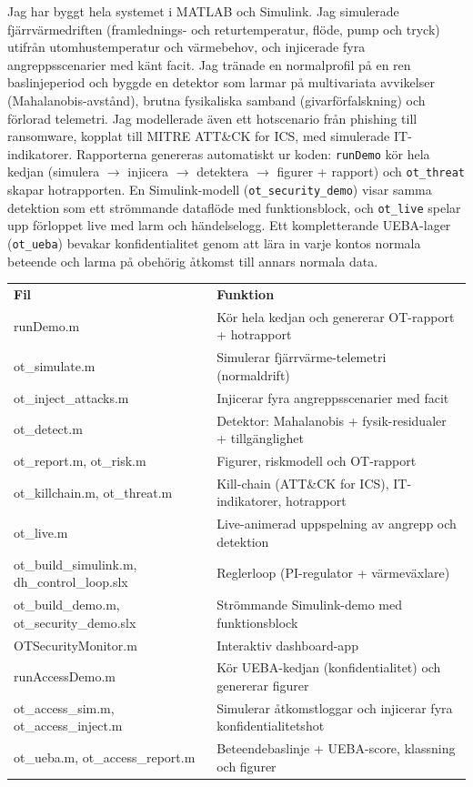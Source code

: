 \documentclass[11pt,a4paper]{article}
\newcommand{\secbar}[1]{\vspace{4pt}{\color{th}\large\bfseries #1}\par\vspace{-4pt}{\color{th}\rule{\linewidth}{1.2pt}}\par}
\begin{document}
\secbar{13. Genomförande och filer}
Jag har byggt hela systemet i MATLAB och Simulink. Jag simulerade fjärrvärmedriften
(framlednings- och returtemperatur, flöde, pump och tryck) utifrån utomhustemperatur och
värmebehov, och injicerade fyra angreppsscenarier med känt facit. Jag tränade en normalprofil på en
ren baslinjeperiod och byggde en detektor som larmar på multivariata avvikelser (Mahalanobis-avstånd),
brutna fysikaliska samband (givarförfalskning) och förlorad telemetri. Jag modellerade även ett
hotscenario från phishing till ransomware, kopplat till MITRE ATT\&CK for ICS, med simulerade
IT-indikatorer. Rapporterna genereras automatiskt ur koden: \texttt{runDemo} kör hela kedjan
(simulera $\rightarrow$ injicera $\rightarrow$ detektera $\rightarrow$ figurer + rapport) och
\texttt{ot\_threat} skapar hotrapporten. En Simulink-modell (\texttt{ot\_security\_demo}) visar samma
detektion som ett strömmande dataflöde med funktionsblock, och \texttt{ot\_live} spelar upp förloppet
live med larm och händelselogg. Ett kompletterande UEBA-lager (\texttt{ot\_ueba}) bevakar konfidentialitet genom att lära in varje kontos normala beteende och larma på obehörig åtkomst till annars normala data.

\begin{tabularx}{\linewidth}{@{}l X@{}}
\rowcolor{th}\color{white}\textbf{Fil} & \color{white}\textbf{Funktion}\\
runDemo.m & Kör hela kedjan och genererar OT-rapport + hotrapport\\
ot\_simulate.m & Simulerar fjärrvärme-telemetri (normaldrift)\\
ot\_inject\_attacks.m & Injicerar fyra angreppsscenarier med facit\\
ot\_detect.m & Detektor: Mahalanobis + fysik-residualer + tillgänglighet\\
ot\_report.m, ot\_risk.m & Figurer, riskmodell och OT-rapport\\
ot\_killchain.m, ot\_threat.m & Kill-chain (ATT\&CK for ICS), IT-indikatorer, hotrapport\\
ot\_live.m & Live-animerad uppspelning av angrepp och detektion\\
ot\_build\_simulink.m, dh\_control\_loop.slx & Reglerloop (PI-regulator + värmeväxlare)\\
ot\_build\_demo.m, ot\_security\_demo.slx & Strömmande Simulink-demo med funktionsblock\\
OTSecurityMonitor.m & Interaktiv dashboard-app\\
runAccessDemo.m & Kör UEBA-kedjan (konfidentialitet) och genererar figurer\\
ot\_access\_sim.m, ot\_access\_inject.m & Simulerar åtkomstloggar och injicerar fyra konfidentialitetshot\\
ot\_ueba.m, ot\_access\_report.m & Beteendebaslinje + UEBA-score, klassning och figurer\\
\end{tabularx}
\end{document}

